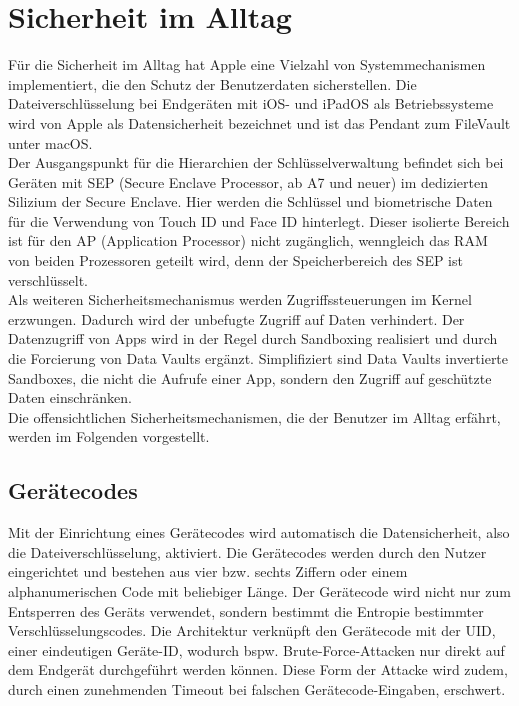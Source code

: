 \section{Sicherheit im Alltag}
Für die Sicherheit im Alltag hat Apple eine Vielzahl von Systemmechanismen implementiert, 
die den Schutz der Benutzerdaten sicherstellen. Die Dateiverschlüsselung bei Endgeräten mit iOS- und 
iPadOS als Betriebssysteme wird von Apple als Datensicherheit bezeichnet und ist das Pendant zum 
FileVault unter macOS. \\

Der Ausgangspunkt für die Hierarchien der Schlüsselverwaltung befindet sich bei Geräten 
mit SEP (Secure Enclave Processor, ab A7 und neuer) im dedizierten Silizium der Secure Enclave. 
Hier werden die Schlüssel und biometrische Daten für die Verwendung von Touch ID und Face ID 
hinterlegt. Dieser isolierte Bereich ist für den AP (Application Processor) nicht zugänglich, wenngleich 
das RAM von beiden Prozessoren geteilt wird, denn der Speicherbereich des SEP ist verschlüsselt. \\

Als weiteren Sicherheitsmechanismus werden Zugriffssteuerungen im Kernel erzwungen. Dadurch wird der unbefugte 
Zugriff auf Daten verhindert. Der Datenzugriff von Apps wird in der Regel durch Sandboxing realisiert und durch die 
Forcierung von Data Vaults ergänzt. Simplifiziert sind Data Vaults invertierte Sandboxes, die nicht die Aufrufe einer App, 
sondern den Zugriff auf geschützte Daten einschränken. \\

Die offensichtlichen Sicherheitsmechanismen, die der Benutzer im Alltag erfährt, werden im Folgenden vorgestellt.

\subsection{Gerätecodes}
Mit der Einrichtung eines Gerätecodes wird automatisch die Datensicherheit, also die Dateiverschlüsselung, aktiviert. 
Die Gerätecodes werden durch den Nutzer eingerichtet und bestehen aus vier bzw. sechts Ziffern oder einem alphanumerischen 
Code mit beliebiger Länge. Der Gerätecode wird nicht nur zum Entsperren des Geräts verwendet, sondern bestimmt 
die Entropie bestimmter Verschlüsselungscodes. Die Architektur verknüpft den Gerätecode mit der UID, einer eindeutigen
Geräte-ID, wodurch bspw. Brute-Force-Attacken nur direkt auf dem Endgerät durchgeführt werden können.
Diese Form der Attacke wird zudem, durch einen zunehmenden Timeout bei falschen Gerätecode-Eingaben, erschwert.
\\

